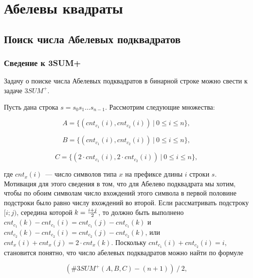 \section{Абелевы квадраты}

\subsection{Поиск числа Абелевых подквадратов}

\subsubsection{Сведение к 3SUM+}
Задачу о поиске числа Абелевых подквадратов в бинарной строке можно свести к задаче $3SUM^+$.

Пусть дана строка $s=s_0s_1 \ldots s_{n-1}$. Рассмотрим следующие множества:

\begin{equation}
A = \{ (cnt_{c_1}(i), cnt_{c_2}(i))\ |\ 0 \le i \le n \},
\end{equation}

\begin{equation}
B = \{ (cnt_{c_1}(i), cnt_{c_2}(i))\ |\ 0 \le i \le n \},
\end{equation}

\begin{equation}
C = \{ (2 \cdot cnt_{c_1}(i), 2 \cdot cnt_{c_2}(i))\ |\ 0 \le i \le n \},
\end{equation}


где $cnt_x(i)$~--- число символов типа $x$ на префиксе длины $i$ строки $s$. Мотивация для этого сведения в том, что для Абелево подквадрата мы хотим, чтобы по обоим символам число вхождений этого символа в первой половине подстроки было равно числу вхождений во второй. Если рассматривать подстроку $[i; j)$, середина которой $k={{i+j} \over 2}$, то должно быть выполнено $cnt_{c_1}(k)-cnt_{c_1}(i)=cnt_{c_1}(j)-cnt_{c_1}(k)$ и $cnt_{c_2}(k)-cnt_{c_2}(i)=cnt_{c_2}(j)-cnt_{c_2}(k)$, или $cnt_x(i)+cnt_x(j)=2 \cdot cnt_x(k)$. Поскольку $cnt_{c_1}(i)+cnt_{c_2}(i)=i$, становится понятно, что число абелевых подквадратов можно найти по формуле 

\begin{equation}
(\#3SUM^+(A, B, C) - (n+1))\ /\ 2,
\end{equation}

